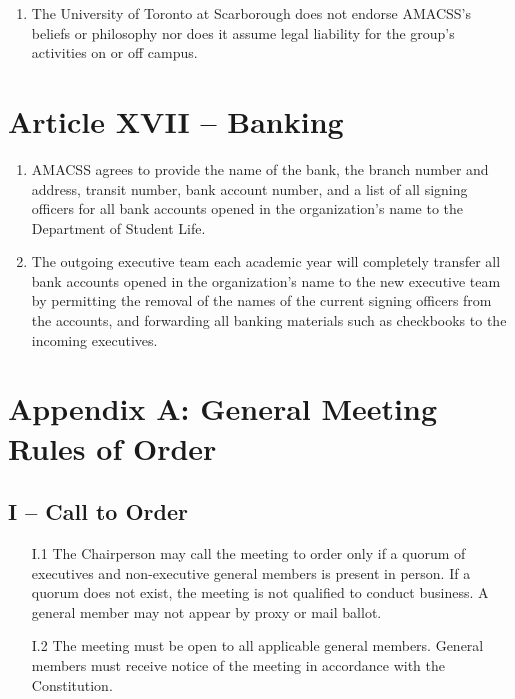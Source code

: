 \documentclass[12pt,a4paper]{article}
\begin{document}
\begin{enumerate}
\item The University of Toronto at Scarborough does not endorse AMACSS's beliefs or philosophy nor does it assume legal liability for the group's activities on or off campus.
\end{enumerate}

\section*{Article XVII – Banking}

\begin{enumerate}
\item AMACSS agrees to provide the name of the bank, the branch number and address, transit number, bank account number, and a list of all signing officers for all bank accounts opened in the organization's name to the Department of Student Life.

\item The outgoing executive team each academic year will completely transfer all bank accounts opened in the organization's name to the new executive team by permitting the removal of the names of the current signing officers from the accounts, and forwarding all banking materials such as checkbooks to the incoming executives.
\end{enumerate}

\section*{Appendix A: General Meeting Rules of Order}

\subsection*{I – Call to Order}
 
 
\begin{enumerate}
\item[I.1] The Chairperson may call the meeting to order only if a quorum of executives and non-executive general members is present in person. If a quorum does not exist, the meeting is not qualified to conduct business. A general member may not appear by proxy
or mail ballot.

\item[I.2] The meeting must be open to all applicable general members. General members must receive notice of the meeting in accordance with the Constitution.
\end{enumerate}
\end{document}

